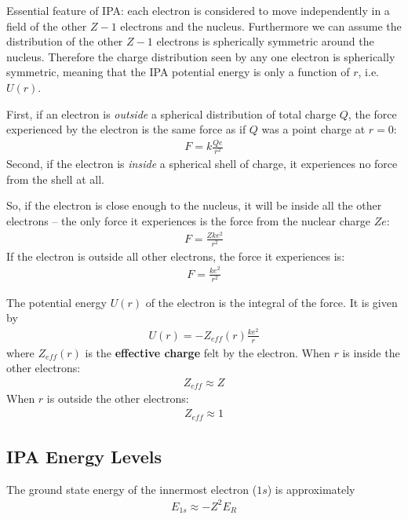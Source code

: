 \documentclass[10pt]{article}
\begin{document}
Essential feature of IPA: each electron is considered to move independently in a field of the other $Z-1$ electrons and the nucleus. Furthermore we can assume the distribution of the other $Z-1$ electrons is spherically symmetric around the nucleus.  Therefore the charge distribution seen by any one electron is spherically symmetric, meaning that the IPA potential energy is only a function
of $r$, i.e. $U(r)$.

First, if an electron is \textit{outside} a spherical distribution of total charge $Q$, the force experienced by the electron is the same force as if $Q$ was a point charge at $r = 0$:
\begin{align}
    F = k \frac{Qe}{r^2}
\end{align}
Second, if the electron is \textit{inside} a spherical shell of charge, it experiences no force from the shell at all.

So, if the electron is close enough to the nucleus, it will be inside all the other electrons -- the only force it experiences is the force from the nuclear charge $Ze$:
\begin{align}
    F = \frac{Zke^2}{r^2}
\end{align}
If the electron is outside all other electrons, the force it experiences is:
\begin{align}
    F = \frac{ke^2}{r^2}    
\end{align}

The potential energy $U(r)$ of the electron is the integral of the force. It is given by
\begin{align}
    U(r) = -Z_{eff}(r) \frac{ke^2}{r}    
\end{align}
where $Z_{eff}(r)$ is the \textbf{effective charge} felt by the electron. When $r$ is inside the other electrons:
\begin{align}
    Z_{eff} \approx Z
\end{align}
When $r$ is outside the other electrons:
\begin{align}
    Z_{eff} \approx 1
\end{align}



\subsection{IPA Energy Levels}
The ground state energy of the innermost electron ($1s$) is approximately
\begin{align}
    E_{1s} \approx -Z^2 E_R
\end{align}
\end{document}
